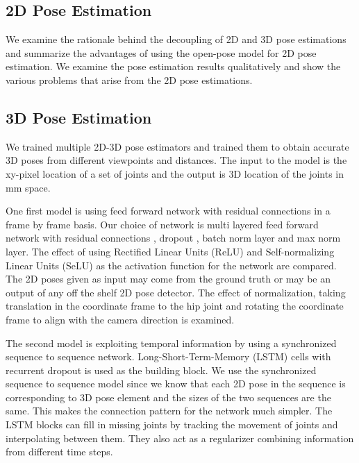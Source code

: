 \subsection{2D Pose Estimation}

We examine the rationale behind the decoupling of 2D and 3D pose estimations and summarize the advantages of using the open-pose \parencite{cao2016realtime} model for 2D pose estimation. We examine the pose estimation results qualitatively and show the various problems that arise from the 2D pose estimations.

\subsection{3D Pose Estimation}

We trained multiple 2D-3D pose estimators and trained them to obtain accurate 3D poses from different viewpoints and distances. The input to the model is the xy-pixel location of a set of joints and the output is 3D location of the joints in mm space.

One first model is using feed forward network with residual connections in a frame by frame basis. Our choice of network is multi layered feed forward network with residual connections \parencite{he2016deep}, dropout \parencite{srivastava2014dropout}, batch norm layer \parencite{ioffe2015batch} and max norm layer. The effect of using Rectified Linear Units (ReLU) \parencite{nair2010rectified} and Self-normalizing Linear Units (SeLU) \parencite{klambauer2017self} as the activation function for the network are compared. The 2D poses given as input may come from the ground truth or may be an output of any off the shelf 2D pose detector. The effect of normalization, taking translation in the coordinate frame to the hip joint and rotating the coordinate frame to align with the camera direction is examined. 

The second model is exploiting temporal information by using a synchronized sequence to sequence network. Long-Short-Term-Memory (LSTM) \parencite{hochreiter1997long} cells with recurrent dropout \parencite{semeniuta2016recurrent} is used as the building block. We use the synchronized sequence to sequence model since we know that each 2D pose in the sequence is corresponding to 3D pose element and the sizes of the two sequences are the same. This makes the connection pattern for the network much simpler. The LSTM blocks can fill in missing joints by tracking the movement of joints and interpolating between them. They also act as a regularizer combining information from different time steps.  

